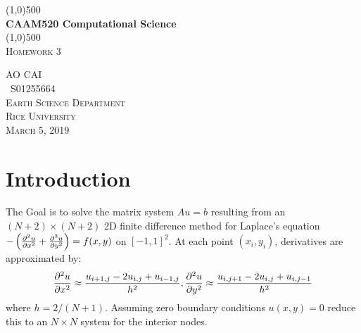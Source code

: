 \documentclass[12pt]{article}
\begin{document}

\begin{titlepage}
	\begin{center}
	\line(1,0){500}\\
	[0.25in]
	\huge{\bfseries CAAM520 Computational Science}\\
	[2mm]
	\line(1,0){500}\\
	[1.5cm]
	\textsc{\LARGE Homework 3}\\
	[8cm] 
	\end{center}
	\begin{flushright}
	\textsc{\large AO CAI \\
	\ S01255664\\
	Earth Science Department\\
	Rice University\\
	March 5, 2019\\}
	\end{flushright}

\end{titlepage}


\tableofcontents
\thispagestyle{empty}
\cleardoublepage

\setcounter{page}{1}

\section{Introduction}\label{sec:intro}
The Goal is to solve the matrix system {\bfseries$Au=b$} resulting from an $(N+2)\times(N+2)$ 2D finite difference method for Laplace's equation $-\left(\pdv[2]{u}{x} + \pdv[2]{u}{y} \right) = f(x,y)$ on $[-1,1]^2$. At each point $(x_i,y_i)$, derivatives are approximated by:
$$\pdv[2]{u}{x} \approx \frac{u_{i+1,j}-2u_{i,j}+u_{i-1,j}}{h^2}, \pdv[2]{u}{y} \approx \frac{u_{i,j+1}-2u_{i,j}+u_{i,j-1}}{h^2}$$
where $h = 2/(N+1)$. Assuming zero boundary conditions $u(x,y) = 0$ reduce this to an $N \times N$ system for the interior nodes.
\end{document}
